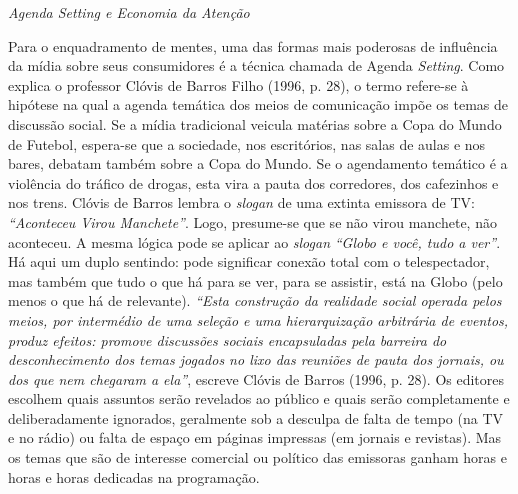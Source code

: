 \emph{Agenda Setting e Economia da Atenção}

Para o enquadramento de mentes, uma das formas mais poderosas de
influência da mídia sobre seus consumidores é a técnica chamada de
Agenda \emph{Setting}. Como explica o professor Clóvis de Barros Filho
(1996, p. 28), o termo refere-se à hipótese na qual a agenda temática
dos meios de comunicação impõe os temas de discussão social. Se a mídia
tradicional veicula matérias sobre a Copa do Mundo de Futebol, espera-se
que a sociedade, nos escritórios, nas salas de aulas e nos bares,
debatam também sobre a Copa do Mundo. Se o agendamento temático é a
violência do tráfico de drogas, esta vira a pauta dos corredores, dos
cafezinhos e nos trens. Clóvis de Barros lembra o \emph{slogan} de uma
extinta emissora de TV: \emph{``Aconteceu Virou Manchete''}. Logo,
presume-se que se não virou manchete, não aconteceu. A mesma lógica pode
se aplicar ao \emph{slogan} \emph{``Globo e você, tudo a ver''}. Há aqui
um duplo sentindo: pode significar conexão total com o telespectador,
mas também que tudo o que há para se ver, para se assistir, está na
Globo (pelo menos o que há de relevante). \emph{``Esta construção da
realidade social operada pelos meios, por intermédio de uma seleção e
uma hierarquização arbitrária de eventos, produz efeitos: promove
discussões sociais encapsuladas pela barreira do desconhecimento dos
temas jogados no lixo das reuniões de pauta dos jornais, ou dos que nem
chegaram a ela''}, escreve Clóvis de Barros (1996, p. 28). Os editores
escolhem quais assuntos serão revelados ao público e quais serão
completamente e deliberadamente ignorados, geralmente sob a desculpa de
falta de tempo (na TV e no rádio) ou falta de espaço em páginas
impressas (em jornais e revistas). Mas os temas que são de interesse
comercial ou político das emissoras ganham horas e horas e horas
dedicadas na programação.

